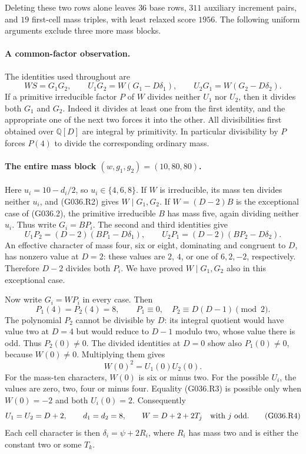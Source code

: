 Deleting these two rows alone leaves $36$ base rows,
$311$ auxiliary increment pairs, and $19$ first-cell
mass triples, with least relaxed score $1956$.
The following uniform arguments exclude three more
mass blocks.

\paragraph{A common-factor observation.}
The identities used throughout are
\[
 WS=G_1G_2,\qquad U_1G_2=W(G_1-D\delta_1),\qquad
 U_2G_1=W(G_2-D\delta_2).                            \tag{G036.R2}
\]
If a primitive irreducible factor $P$ of $W$ divides
neither $U_1$ nor $U_2$, then it divides both $G_1$
and $G_2$. Indeed it divides at least one from the
first identity, and the appropriate one of the next
two forces it into the other. All divisibilities
first obtained over $\mathbb Q[D]$ are integral by
primitivity. In particular divisibility by $P$ forces
$P(4)$ to divide the corresponding ordinary mass.

\paragraph{The entire mass block $(w,g_1,g_2)=(10,80,80)$.}
Here $u_i=10-d_i/2$, so $u_i\in\{4,6,8\}$.
If $W$ is irreducible, its mass ten divides neither
$u_i$, and (G036.R2) gives $W\mid G_1,G_2$.
If $W=(D-2)B$ is the exceptional case of (G036.2),
the primitive irreducible $B$ has mass five, again
dividing neither $u_i$. Thus write $G_i=BP_i$.
The second and third identities give
\[
 U_1P_2=(D-2)(BP_1-D\delta_1),\qquad
 U_2P_1=(D-2)(BP_2-D\delta_2).
\]
An effective character of mass four, six or eight,
dominating and congruent to $D$, has nonzero value
at $D=2$: these values are $2$, $4$, or one of
$6,2,-2$, respectively. Therefore $D-2$ divides
both $P_i$. We have proved $W\mid G_1,G_2$ also
in this exceptional case.

Now write $G_i=WP_i$ in every case. Then
\[
 P_1(4)=P_2(4)=8,\qquad P_1\equiv0,\quad
 P_2\equiv D(D-1)\pmod2.
\]
The polynomial $P_2$ cannot be divisible by $D$:
its integral quotient would have value two at $D=4$
but would reduce to $D-1$ modulo two, whose value
there is odd. Thus $P_2(0)\ne0$.
The divided identities at $D=0$ show also
$P_1(0)\ne0$, because $W(0)\ne0$.
Multiplying them gives
\[
                        W(0)^2=U_1(0)U_2(0).        \tag{G036.R3}
\]
For the mass-ten characters, $W(0)$ is six or
minus two. For the possible $U_i$, the values are
zero, two, four or minus four. Equality (G036.R3)
is possible only when $W(0)=-2$ and both $U_i(0)=2$.
Consequently
\[
 U_1=U_2=D+2,\qquad d_1=d_2=8,\qquad
 W=D+2+2T_j\quad\hbox{with }j\hbox{ odd}.             \tag{G036.R4}
\]
Each cell character is then $\delta_i=\psi+2R_i$,
where $R_i$ has mass two and is either the constant
two or some $T_k$.

